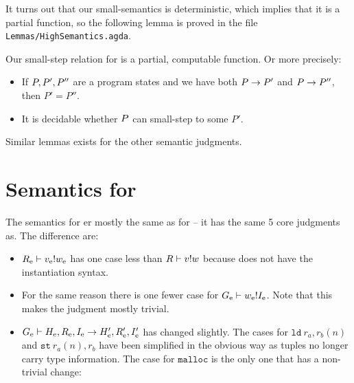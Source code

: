 It turns out that our small-semantics is deterministic, which implies that it is
a partial function, so the following lemma is proved in the file
\texttt{Lemmas/HighSemantics.agda}.

\begin{lemma}
  \label{lemma:computhigh}
  Our small-step relation for \ATAL is a partial, computable function. Or more
  precisely:

  \begin{itemize}
  \item If $P, P', P''$ are a program states and we have both
    ${P} -> {P'}$ and ${P} -> {P''}$, then
    $P' = P''$.
  \item It is decidable whether $P$ can small-step to some $P'$.
  \end{itemize}

  Similar lemmas exists for the other semantic judgments.
\end{lemma}

\section{Semantics for \ATALe}

The semantics for \ATALe er mostly the same as for \ATAL -- it has the same 5
core judgments as. The difference are:

\begin{itemize}
\item ${R_{\mathrm{e}}} |- {v_{\mathrm{e}}} ! {w_{\mathrm{e}}}$ has one case less than
  ${R} |- {v} ! {w}$ because \ATALe does not have the
  instantiation syntax.
\item For the same reason there is one fewer case for
  ${G_{\mathrm{e}}} |- {w_{\mathrm{e}}} ! {I_{\mathrm{e}}}$. Note that this makes the
  judgment mostly trivial.
\item
  ${G_{\mathrm{e}}} |- {H_{\mathrm{e}}, R_{\mathrm{e}}, I_{\mathrm{e}}} -> {H_{\mathrm{e}}', R_{\mathrm{e}}',
    I_{\mathrm{e}}'}$ has changed slightly. The cases for $\mathtt{ld}\ r_a, r_b(n)$
  and $\mathtt{st}\ r_a(n), r_b$ have been simplified in the obvious way as
  tuples no longer carry type information. The case for $\mathtt{malloc}$ is the
  only one that has a non-trivial change:
\end{itemize}


